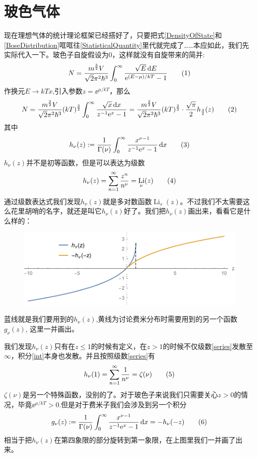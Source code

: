 \documentclass[]{article}
\DeclareMathOperator{\li}{Li}
\begin{document}
	\section{玻色气体}\label{sec:2}
	现在理想气体的统计理论框架已经搭好了，只要把式\eqref{DensityOfState}和\eqref{BoseDistribution}哐哐往\eqref{StatisticalQuantity}里代就完成了……本应如此，我们先实际代入一下。玻色子自旋假设为0，这样就没有自旋带来的简并:
	\[\label{5}N=\frac{m^{\frac 32}V}{\sqrt{2}\pi^2\hbar^3}\int_0^\infty\frac{\sqrt{E}\diff E}{\ee^{(E-\mu)/kT}-1}\taghere\]
	作换元$ E\to kTx $,引入参数$ z=\ee^{\mu/kT} $，那么
	\[\label{6}N=\frac{m^{\frac 32}V}{\sqrt{2}\pi^2\hbar^3}(kT)^{\frac 32}\int_0^\infty\frac{\sqrt{x}\diff x}{z^{-1}\ee^x-1}=\frac{m^{\frac 32}V}{\sqrt{2}\pi^2\hbar^3}(kT)^{\frac 32}\cdot\frac{\sqrt\pi}{2}h_{\frac 32}(z)\taghere\]
	其中
	\[\label{int}h_\nu(z):=\frac 1{\Gamma(\nu)}\int_0^{\infty}\frac{x^{\nu-1}}{z^{-1}\ee^x-1}\diff x\taghere\]
	$ h_\nu(z) $并不是初等函数，但是可以表达为级数
	\[\label{series}h_\nu(z)=\sum_{n=1}^\infty\frac{z^n}{n^\nu}=\li_\nu(z)\taghere\]
	通过级数表达式我们发现$ h_\nu(z) $就是多对数函数$ \li_s(z) $。不过我们不太需要这么花里胡哨的名字，就还是叫它$ h_\nu(z) $好了。我们把$ h_\nu(z) $画出来，看看它是什么样的：
	\begin{figure}[h]
		\includegraphics[width=\linewidth]{fig1}\label{fig1}
	\end{figure}
	蓝线就是我们要用到的$ h_\nu(z) $,黄线为讨论费米分布时需要用到的另一个函数$ g_\nu(z) $, 这里一并画出。
	
	我们发现$ h_\nu(z) $只有在$ z\le 1 $的时候有定义，在$ z>1 $的时候不仅级数\eqref{series}发散至$ \infty $，积分\eqref{int}本身也发散。并且按照级数\eqref{series}有
	\[h_\nu(1)=\sum_{n=1}^{\infty}\frac{1}{n^\nu}=\zeta(\nu)\taghere\]
	$ \zeta(\nu) $是另一个特殊函数，没别的了。对于玻色子来说我们只需要关心$ z>0 $的情况，毕竟$ \ee^{\mu/kT}>0 $.但是对于费米子我们会涉及到另一个积分
	\[g_\nu(z):=\frac{1}{\Gamma(\nu)}\int_0^\infty\frac{x^{\nu-1}}{z^{-1}\ee^x-1}\diff x=-h_\nu(-z)\taghere\]
	相当于把$ h_\nu(z) $在第四象限的部分旋转到第一象限，在上图里我们一并画了出来。
	
\end{document}
